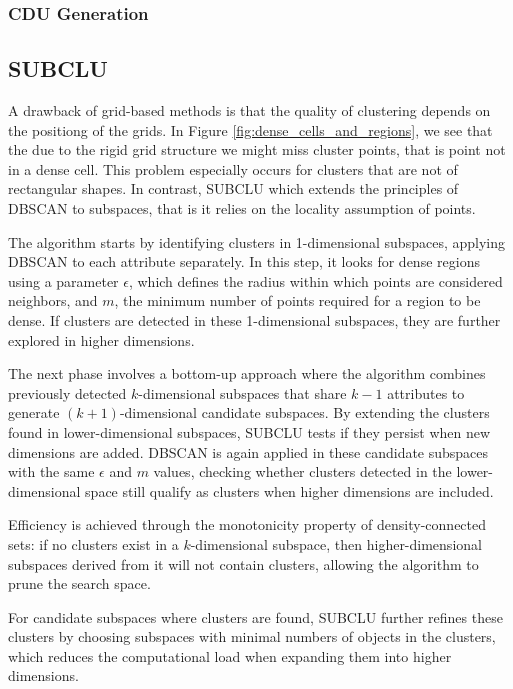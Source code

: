 \subsubsection{CDU Generation}

\subsection{SUBCLU}
A drawback of grid-based methods is that the quality of clustering depends on the positiong of the grids. In Figure \ref{fig:dense_cells_and_regions}, we see that the due to the rigid grid structure we might miss cluster points, that is point not in a dense cell. This problem especially occurs for clusters that are not of rectangular shapes. In contrast, SUBCLU which extends the principles of DBSCAN to subspaces, that is it relies on the locality assumption of points.

The algorithm starts by identifying clusters in 1-dimensional subspaces, applying DBSCAN to each attribute separately. In this step, it looks for dense regions using a parameter $\epsilon$, which defines the radius within which points are considered neighbors, and $m$, the minimum number of points required for a region to be dense. If clusters are detected in these 1-dimensional subspaces, they are further explored in higher dimensions.

The next phase involves a bottom-up approach where the algorithm combines previously detected $k$-dimensional subspaces that share $k-1$ attributes to generate $(k+1)$-dimensional candidate subspaces. By extending the clusters found in lower-dimensional subspaces, SUBCLU tests if they persist when new dimensions are added. DBSCAN is again applied in these candidate subspaces with the same $\epsilon$ and $m$ values, checking whether clusters detected in the lower-dimensional space still qualify as clusters when higher dimensions are included.

Efficiency is achieved through the monotonicity property of density-connected sets: if no clusters exist in a $k$-dimensional subspace, then higher-dimensional subspaces derived from it will not contain clusters, allowing the algorithm to prune the search space.

For candidate subspaces where clusters are found, SUBCLU further refines these clusters by choosing subspaces with minimal numbers of objects in the clusters, which reduces the computational load when expanding them into higher dimensions.